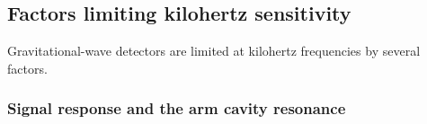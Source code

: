 

\subsection{Factors limiting kilohertz sensitivity}
\label{sec:intro_factors_limiting_kHz}

Gravitational-wave detectors are limited at kilohertz frequencies by several factors.

\subsubsection{Signal response and the arm cavity resonance}

